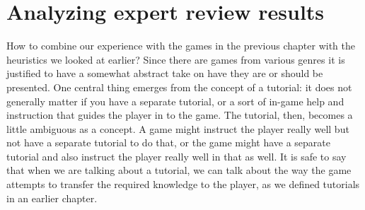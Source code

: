 \chapter{Analyzing expert review results}

How to combine our experience with the games in the previous chapter with the heuristics we looked at earlier? Since there are games from various genres it is justified to have a somewhat abstract take on have they are or should be presented. One central thing emerges from the concept of a tutorial: it does not generally matter if you have a separate tutorial, or a sort of in-game help and instruction that guides the player in to the game. The tutorial, then, becomes a little ambiguous as a concept. A game might instruct the player really well but not have a separate tutorial to do that, or the game might have a separate tutorial and also instruct the player really well in that as well. It is safe to say that when we are talking about a tutorial, we can talk about the way the game attempts to transfer the required knowledge to the player, as we defined tutorials in an earlier chapter. 



